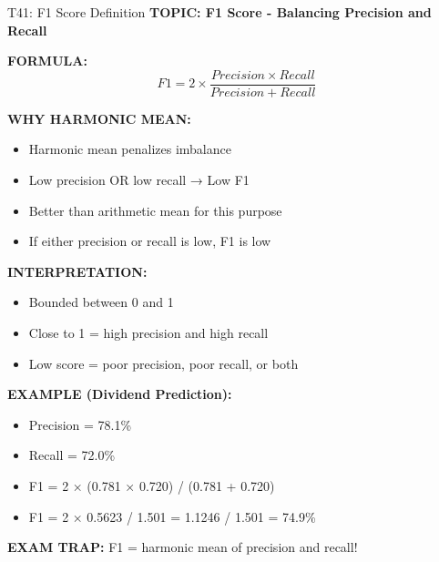 \documentclass[8pt]{beamer}
\begin{document}
	\begin{frame}{T41: F1 Score Definition}
		\fontsize{6.5}{7.5}\selectfont
		\textbf{TOPIC: F1 Score - Balancing Precision and Recall}
		
		\vspace{0.1cm}
		\textbf{FORMULA:}
		\[
		F1 = 2 \times \frac{Precision \times Recall}{Precision + Recall}
		\]
		
		\vspace{0.1cm}
		\textbf{WHY HARMONIC MEAN:}
		\begin{itemize}
			\item Harmonic mean penalizes imbalance
			\item Low precision OR low recall → Low F1
			\item Better than arithmetic mean for this purpose
			\item If either precision or recall is low, F1 is low
		\end{itemize}
		
		\vspace{0.1cm}
		\textbf{INTERPRETATION:}
		\begin{itemize}
			\item Bounded between 0 and 1
			\item Close to 1 = high precision and high recall
			\item Low score = poor precision, poor recall, or both
		\end{itemize}
		
		\vspace{0.1cm}
		\textbf{EXAMPLE (Dividend Prediction):}
		\begin{itemize}
			\item Precision = 78.1\%
			\item Recall = 72.0\%
			\item F1 = 2 × (0.781 × 0.720) / (0.781 + 0.720)
			\item F1 = 2 × 0.5623 / 1.501 = 1.1246 / 1.501 = 74.9\%
		\end{itemize}
		
		\textcolor{myred}{\textbf{EXAM TRAP:}} F1 = \textcolor{myblue}{harmonic mean of precision and recall}!
	\end{frame}
	
\end{document}
